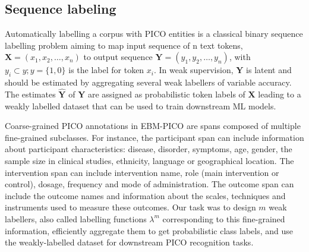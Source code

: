 \documentclass[10.7pt,]{article}
\begin{document}
\subsection{Sequence labeling}\label{seq_lab}
%
Automatically labelling a corpus with PICO entities is a classical binary sequence labelling problem aiming to map input sequence of n text tokens, $ \bm{X} = (x_{1}, x_{2}, \dotso , x_{n} )$ to output sequence $\bm{Y} = (y_{1}, y_{2}, \dotso , y_{n} )$, with $y_{i} \subset y; y = \{1,0\} $ is the label for token $x_{i}$.
In weak supervision, $\bm{Y}$ is latent and should be estimated by aggregating several weak labellers of variable accuracy.
The estimates $\bm{\hat{Y}}$ of $\bm{Y}$ are assigned as probabilistic token labels of $\bm{X}$ leading to a weakly labelled dataset that can be used to train downstream ML models.


Coarse-grained PICO annotations in EBM-PICO are spans composed of multiple fine-grained subclasses.
For instance, the participant span can include information about participant characteristics: disease, disorder, symptoms, age, gender, the sample size in clinical studies, ethnicity, language or geographical location.
The intervention span can include intervention name, role (main intervention or control), dosage, frequency and mode of administration.
The outcome span can include the outcome names and information about the scales, techniques and instruments used to measure these outcomes.
Our task was to design $m$ weak labellers, also called labelling functions $\lambda^{m}$ corresponding to this fine-grained information, efficiently aggregate them to get probabilistic class labels, and use the weakly-labelled dataset for downstream PICO recognition tasks.
%
%
%
\end{document}

